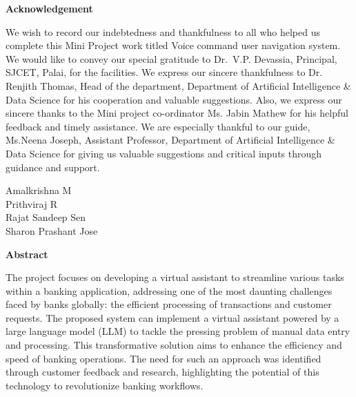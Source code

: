 \newpage
\thispagestyle{empty}
\begin{center}
  \vspace*{1cm}
  \textbf{\large Acknowledgement}
\end{center}
We wish to record our indebtedness and thankfulness to all who helped us complete this Mini Project work titled Voice command user navigation system. We would like to convey our special gratitude to Dr.~V.P. Devassia, Principal, SJCET, Palai, for the facilities. We express our sincere thankfulness to Dr. Renjith Thomas, Head of the department, Department of Artificial Intelligence \& Data Science for his cooperation and valuable suggestions. Also, we express our sincere thanks to the Mini project co-ordinator Ms. Jabin Mathew for his helpful feedback and timely assistance.
We are especially thankful to our guide, Ms.Neena Joseph, Assistant Professor, Department of Artificial Intelligence \& Data Science for giving us valuable suggestions and critical inputs through guidance and support.
 \\
\begin{flushright}
Amalkrishna M \\
Prithviraj R \\
Rajat Sandeep Sen \\
Sharon Prashant Jose
\end{flushright}

\newpage
\thispagestyle{empty}
\begin{center}
  \textbf{\large Abstract}
\end{center}
The project focuses on developing a virtual assistant to streamline various tasks within a banking application, addressing one of the most daunting challenges faced by banks globally: the efficient processing of transactions and customer requests. The proposed system can implement a virtual assistant powered by a large language model (LLM) to tackle the pressing problem of manual data entry and processing. This transformative solution aims to enhance the efficiency and speed of banking operations. The need for such an approach was identified through customer feedback and research, highlighting the potential of this technology to revolutionize banking workflows.

